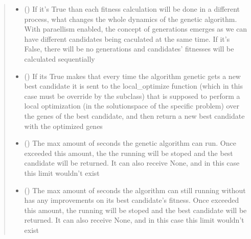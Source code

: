 \documentclass[letterpaper,10pt,english]{sphinxmanual}
\begin{document}
\begin{fulllineitems}
\begin{quote}
\begin{description}
\begin{itemize}
\item {} 
\sphinxAtStartPar
{} () \textendash{} If it’s True than each fitness calculation will be done in a different process, what changes
the whole dynamics of the genetic algorithm. With paraellism enabled, the concept of generations emerges as
we can have different candidates being caculated at the same time. If it’s False, there will be no
generations and candidates’ fitnesses will be calculated sequentially

\item {} 
\sphinxAtStartPar
{} () \textendash{} If its True makes that every time the algorithm genetic gets a new best candidate it is sent
to the local\_optimize function (which in this case must be override by the subclass) that is supposed to
perform a local optimization (in the solution\sphinxhyphen{}space of the specific problem) over the genes of the best
candidate, and then return a new best candidate with the optimized genes

\item {} 
\sphinxAtStartPar
{} (\sphinxstyleliteralemphasis{\sphinxupquote{{[}}}\sphinxstyleliteralemphasis{\sphinxupquote{, }}\sphinxstyleliteralemphasis{\sphinxupquote{{]}}}) \textendash{} The max amount of seconds the genetic algorithm can run. Once exceeded this amount, the
the running will be stoped and the best candidate will be returned. It can also receive None, and in this
case this limit wouldn’t exist

\item {} 
\sphinxAtStartPar
{} (\sphinxstyleliteralemphasis{\sphinxupquote{{[}}}\sphinxstyleliteralemphasis{\sphinxupquote{, }}\sphinxstyleliteralemphasis{\sphinxupquote{{]}}}) \textendash{} The max amount of seconds the algorithm can still running without has any improvements on its
best candidate’s fitness. Once exceeded this amount, the running will be stoped and the best candidate will
be returned. It can also receive None, and in this case this limit wouldn’t exist


\end{itemize}
\end{description}
\end{quote}
\end{fulllineitems}
\end{document}
